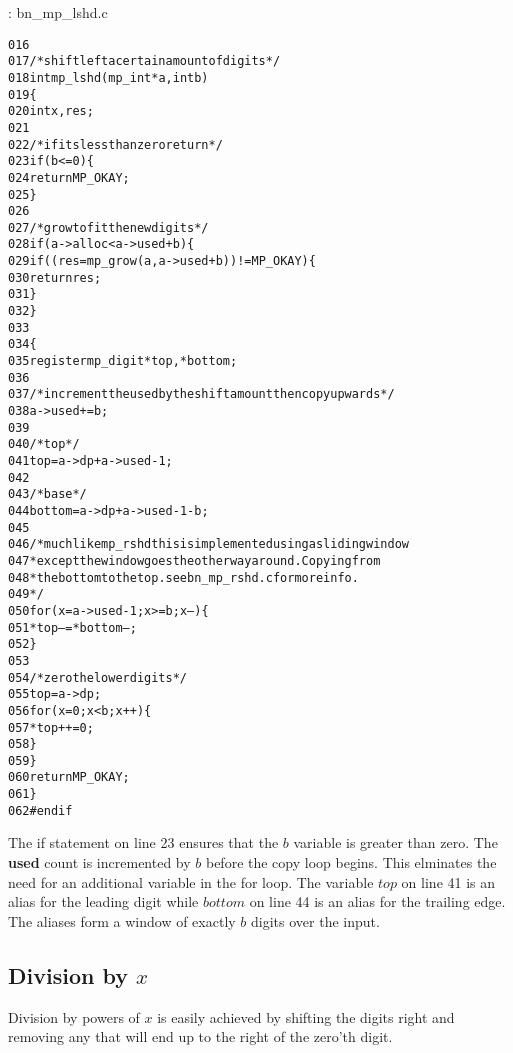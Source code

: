 \documentclass[b5paper]{book}
\begin{document}
\vspace{+3mm}\begin{small}
\hspace{-5.1mm}{\bf File}: bn\_mp\_lshd.c
\vspace{-3mm}
\begin{alltt}
016   
017   /* shift left a certain amount of digits */
018   int mp_lshd (mp_int * a, int b)
019   \{
020     int     x, res;
021   
022     /* if its less than zero return */
023     if (b <= 0) \{
024       return MP_OKAY;
025     \}
026   
027     /* grow to fit the new digits */
028     if (a->alloc < a->used + b) \{
029        if ((res = mp_grow (a, a->used + b)) != MP_OKAY) \{
030          return res;
031        \}
032     \}
033   
034     \{
035       register mp_digit *top, *bottom;
036   
037       /* increment the used by the shift amount then copy upwards */
038       a->used += b;
039   
040       /* top */
041       top = a->dp + a->used - 1;
042   
043       /* base */
044       bottom = a->dp + a->used - 1 - b;
045   
046       /* much like mp_rshd this is implemented using a sliding window
047        * except the window goes the otherway around.  Copying from
048        * the bottom to the top.  see bn_mp_rshd.c for more info.
049        */
050       for (x = a->used - 1; x >= b; x--) \{
051         *top-- = *bottom--;
052       \}
053   
054       /* zero the lower digits */
055       top = a->dp;
056       for (x = 0; x < b; x++) \{
057         *top++ = 0;
058       \}
059     \}
060     return MP_OKAY;
061   \}
062   #endif
\end{alltt}
\end{small}

The if statement on line 23 ensures that the $b$ variable is greater than zero.  The \textbf{used} count is incremented by $b$ before
the copy loop begins.  This elminates the need for an additional variable in the for loop.  The variable $top$ on line 41 is an alias
for the leading digit while $bottom$ on line 44 is an alias for the trailing edge.  The aliases form a window of exactly $b$ digits
over the input.  

\subsection{Division by $x$}

Division by powers of $x$ is easily achieved by shifting the digits right and removing any that will end up to the right of the zero'th digit.  
\end{document}
